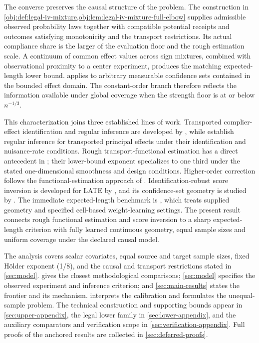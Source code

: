 \documentclass[11pt]{article}
\begin{document}
The converse preserves the causal structure of the problem. The construction in \cref{obj:def:legal-iv-mixture,obj:lem:legal-iv-mixture-full-elbow} supplies admissible observed probability laws together with compatible potential receipts and outcomes satisfying monotonicity and the transport restrictions. Its actual compliance share is the larger of the evaluation floor and the rough estimation scale. A continuum of common effect values across sign mixtures, combined with observational proximity to a center experiment, produces the matching expected-length lower bound.  applies to arbitrary measurable confidence sets contained in the bounded effect domain. The constant-order branch therefore reflects the information available under global coverage when the strength floor is at or below \(n^{-1/3}\).

This characterization joins three established lines of work. Transported complier-effect identification and regular inference are developed by \citet[Theorems 3.1, 4.2 and 4.3]{ChenHuang2025Generalizing}, while \citet[Theorem 6]{Clark2024} establish regular inference for transported principal effects under their identification and nuisance-rate conditions. Rough transport-functional estimation has a direct antecedent in \citet[Theorems 6 and 8]{ZengKennedyBodnarNaimi2025Efficient}; their lower-bound exponent specializes to one third under the stated one-dimensional smoothness and design conditions. Higher-order correction follows the functional-estimation approach of \citet[Section 1]{Robins2008}. Identification-robust score inversion is developed for LATE by \citet[Theorem 3.2]{Ma2026IdentificationRobust}, and its confidence-set geometry is studied by \citet[Section 3 and Theorems 1 and 2]{SmuclerLanniMasip2025Score}. The immediate expected-length benchmark is \citet{CausalSmith2026TransportedLATEStrengthFrontier}, which treats supplied geometry and specified cell-based weight-learning settings. The present result connects rough functional estimation and score inversion to a sharp expected-length criterion with fully learned continuous geometry, equal sample sizes and uniform coverage under the declared causal model.

The analysis covers scalar covariates, equal source and target sample sizes, fixed Hölder exponent (1/8), and the causal and transport restrictions stated in \cref{sec:model}.  gives the closest methodological comparisons; \cref{sec:model} specifies the observed experiment and inference criterion; and \cref{sec:main-results} states the frontier and its mechanism.  interprets the calibration and formulates the unequal-sample problem. The technical construction and supporting bounds appear in \cref{sec:upper-appendix}, the legal lower family in \cref{sec:lower-appendix}, and the auxiliary comparators and verification scope in \cref{sec:verification-appendix}. Full proofs of the anchored results are collected in \cref{sec:deferred-proofs}.
\end{document}
